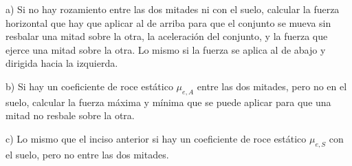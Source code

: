 \documentclass[a4paper, 12pt]{article}
\newcounter{eje}
\begin{document}
a) Si no hay rozamiento entre las dos mitades ni con el suelo, calcular la fuerza horizontal que
hay que aplicar al de arriba para que el conjunto se mueva sin resbalar una mitad sobre la
otra, la aceleración del conjunto, y la fuerza que ejerce una mitad sobre la otra. Lo mismo si la
fuerza se aplica al de abajo y dirigida hacia la izquierda.

b) Si hay un coeficiente de roce estático $\mu_{e,A}$ entre las dos mitades, pero no en el suelo,
calcular la fuerza máxima y mínima que se puede aplicar para que una mitad no resbale sobre
la otra.

c) Lo mismo que el inciso anterior si hay un coeficiente de roce estático $\mu_{e,S}$ con el suelo,
pero no entre las dos mitades.
\end{document}
